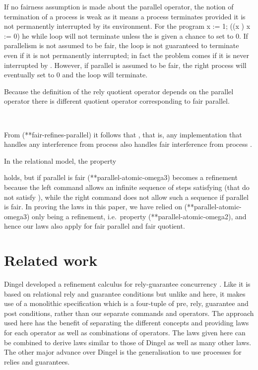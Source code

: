 \documentclass[fleqn]{fac}
\makeatletter
\def\refproperty{\@ifnextchar*{\@refproperty}{\@@refproperty}}
\def\@refproperty*#1{\ref{property-#1}\index{Property!#1|LawUse}}
\def\@@refproperty#1{property~(\ref{property-#1})\index{Property!#1|LawUse}}
\newenvironment{refine}{}
\newcommand{\Keyword}[1]{\mathsf{\mathbf{#1}}}
\newcommand{\While}{\mathop{\Keyword{while}}}
\newcommand{\Do}{\mathop{\Keyword{do}}}
\newcommand{\Skip}{\Keyword{skip}}
\makeatother
\begin{document}
\begin{definitionx}[iteration]
\begin{lemmax}[induction]
If no fairness assumption is made about the parallel operator,
the notion of termination of a process is weak as it means 
a process terminates provided it is not permanently interrupted by its environment.
For the program
\begin{refine}
  x := 1;
  ((\While x  \Do \Skip) \parallel x := 0)
\end{refine}the while loop will not terminate unless the 
is given a chance to set  to 0.
If parallelism is not assumed to be fair, 
the loop is not guaranteed to terminate even if it is not permanently interrupted;
in fact the problem comes if it is never interrupted by .
However, if parallel is assumed to be fair,
the right process will eventually set  to 0 and the loop will terminate.

Because the definition of the rely quotient operator depends on the parallel operator
there is different quotient operator corresponding to fair parallel.
\begin{definitionx}~~~

\end{definitionx}
From (\refproperty*{fair-refines-parallel}) it follows that 
,
that is, any implementation that handles any interference from process 
also handles fair interference from process .

In the relational model, the property

holds, but if parallel is fair (\refproperty*{parallel-atomic-omega3}) becomes a refinement 
because the left command allows an infinite sequence of steps satisfying 
(that do not satisfy ),
while the right command does not allow such a sequence if parallel is fair.
In proving the laws in this paper, we have relied on (\refproperty*{parallel-atomic-omega3}) only being a refinement, 
i.e.\ property (\refproperty*{parallel-atomic-omega2}),
and hence our laws also apply for fair parallel and fair quotient.



\section{Related work}

Dingel developed a refinement calculus for rely-guarantee concurrency \cite{DingelPhD,Dingel02}.
Like \cite{HayesJonesColvin14TR} it is based on relational rely and guarantee conditions
but unlike \cite{HayesJonesColvin14TR} and here, 
it makes use of a monolithic specification which is a four-tuple of pre, rely, guarantee and post conditions,
rather than our separate commands and operators.
The approach used here has the benefit of separating the different concepts 
and providing laws for each operator as well as combinations of operators.
The laws given here can be combined to derive laws similar to those of Dingel as well as many other laws.
The other major advance over Dingel is the generalisation to use processes 
for relies and guarantees.


\end{lemmax}
\end{definitionx}
\end{document}

